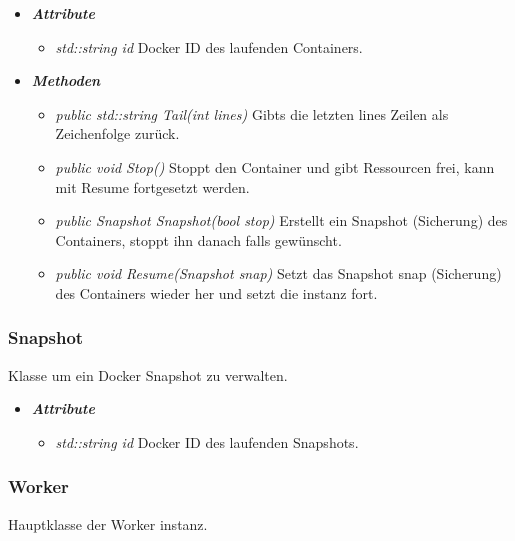 \documentclass[a4paper,12pt]{article}
\begin{document}
\begin{itemize}[label={}]
	\item \textit{\textbf{Attribute}}
		\begin{itemize}[label={\textbullet}]
			\item \textit{std::string id} Docker ID des laufenden Containers.
		\end{itemize}

	\item\textit{\textbf{Methoden}}
		\begin{itemize}[label={\textbullet}]
			\item\textit{public std::string Tail(int lines)} Gibts die letzten lines Zeilen als Zeichenfolge zurück.
			\item\textit{public void Stop()} Stoppt den Container und gibt Ressourcen frei, kann mit Resume fortgesetzt werden.
			\item\textit{public Snapshot Snapshot(bool stop)} Erstellt ein Snapshot (Sicherung) des Containers, stoppt ihn danach falls gewünscht.
			\item\textit{public void Resume(Snapshot snap)} Setzt das Snapshot snap (Sicherung) des Containers wieder her und setzt die instanz fort.
			
		\end{itemize}

\end{itemize}

\subsubsection{Snapshot}

Klasse um ein Docker Snapshot zu verwalten.

\begin{itemize}[label={}]
	\item \textit{\textbf{Attribute}}
		\begin{itemize}[label={\textbullet}]
			\item \textit{std::string id} Docker ID des laufenden Snapshots.
		\end{itemize}

\end{itemize}

\subsubsection{Worker}

Hauptklasse der Worker instanz.
\end{document}

